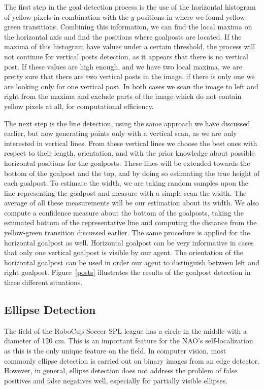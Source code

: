 \documentclass[	DIV=calc,%
							paper=a4,%
							fontsize=9pt,%
							twocolumn]{scrartcl}	 					%
\begin{document}
The first step in the goal detection process is the use of the horizontal histogram of yellow pixels in combination with the $y$-positions in where we found yellow-green transitions. Combining this information, we can find the local maxima on the horizontal axis and find the positions where goalposts are located. If the maxima of this histogram have values under a certain threshold, the process will not continue for vertical posts detection, as it appears that there is no vertical post. If these values are high enough, and we have two local maxima, we are pretty sure that there are two vertical posts in the image, if there is only one we are looking only for one vertical post. In both cases we scan the image to left and right from the maxima and exclude parts of the image which do not contain yellow pixels at all, for computational efficiency.

The next step is the line detection, using the same approach we have discussed earlier, but now generating points only with a vertical scan, as we are only interested in vertical lines. From these vertical lines we choose the best ones with respect to their length, orientation, and with the prior knowledge about possible horizontal positions for the goalposts. These lines will be extended towards the bottom of the goalpost and the top, and by doing so estimating the true height of each goalpost. To estimate the width, we are taking random samples upon the line representing the goalpost and measure with a simple scan the width. The average of all these measurements will be our estimation about its width. We also compute a confidence measure about the bottom of the goalposts, taking the estimated bottom of the representative line and computing the distance from the yellow-green transition discussed earlier. The same procedure is applied for the horizontal goalpost as well. Horizontal goalpost can be very informative in cases that only one vertical goalpost is visible by our agent. The orientation of the horizontal goalpost can be used in order our agent to distinguish between left and right goalpost. Figure~\ref{posts} illustrates the results of the goalpost detection in three different situations.

\subsection{Ellipse Detection}
The field of the RoboCup Soccer SPL league has a circle in the middle with a diameter of 120 cm. This is an important feature for the NAO's self-localization as this is the only unique feature on the field. In computer vision, most commonly ellipse detection is carried out on binary images from an edge detector. However, in general, ellipse detection does not address the problem of false positives and false negatives well, especially for partially visible ellipses.
\end{document}

